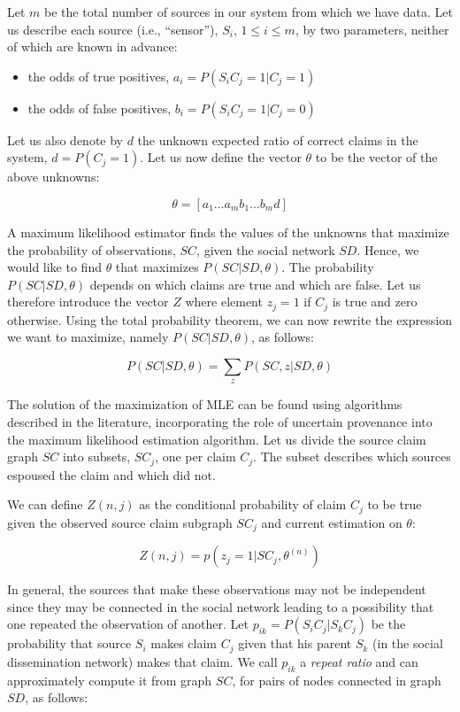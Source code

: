 \documentclass[a4paper,12pt]{article}
\begin{document}
Let $m$ be the total number of sources in our system from which we have data. Let us describe each source (i.e., “sensor”), $S_i$, $1 \le i \le m$, by two parameters, neither of which are known in advance:
\begin{itemize}
	\item the odds of true positives, $a_i = P(S_iC_j = 1|C_j = 1)$
	\item the odds of false positives, $b_i = P(S_iC_j = 1|C_j = 0)$
\end{itemize}
Let us also denote by $d$ the unknown expected ratio of correct claims in the system, $d = P(C_j = 1)$. Let us now define the vector $\theta$ to be the vector of the above unknowns:

$$ \theta = [a_1 \dots a_m b_1 \dots b_m d] $$

A maximum likelihood estimator finds the values of the unknowns that maximize the probability of observations, $SC$, given the social network $SD$. Hence, we would like to find $\theta$ that maximizes $P(SC|SD,\theta)$. The probability $P(SC|SD,\theta)$ depends on which claims are true and which are false. Let us therefore introduce the vector $Z$ where element $z_j = 1$ if $C_j$ is true and zero otherwise. Using the total probability theorem, we can now rewrite the expression we want to maximize, namely $P(SC|SD,\theta)$, as follows:

$$ P(SC|SD,\theta) = \sum_z P(SC,z|SD,\theta) $$

The solution of the maximization of MLE can be found using algorithms described in the literature, incorporating the role of uncertain provenance into the maximum likelihood estimation algorithm. Let us divide the source claim graph $SC$ into subsets, $SC_j$, one per claim $C_j$. The subset describes which sources espoused the claim and which did not.

We can define $Z(n,j)$ as the conditional probability of claim $C_j$ to be true given the observed source claim subgraph $SC_j$ and current estimation on $\theta$:

$$ Z(n,j) = p(z_j = 1 | SC_j, \theta^{(n)}) $$

In general, the sources that make these observations may not be independent since they may be connected in the social network leading to a possibility that one repeated the observation of another. Let $p_{ik} = P(S_iC_j|S_kC_j)$ be the probability that source $S_i$ makes claim $C_j$ given that his parent $S_k$ (in the social dissemination network) makes that claim. We call $p_{ik}$ a \textit{repeat ratio} and can approximately compute it from graph $SC$, for pairs of nodes connected in graph $SD$, as follows:
\end{document}

